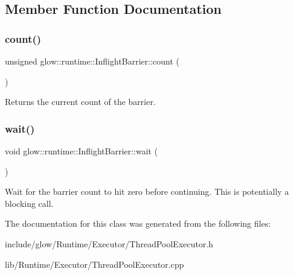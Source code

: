 \subsection{Member Function Documentation}
\mbox{\label{classglow_1_1runtime_1_1_inflight_barrier_acf13957d21ca846a19bc77c8bb841b27}} 
\subsubsection{\texorpdfstring{count()}{count()}}
{\footnotesize\ttfamily unsigned glow\+::runtime\+::\+Inflight\+Barrier\+::count (\begin{DoxyParamCaption}{ }\end{DoxyParamCaption})}

\begin{DoxyReturn}{Returns}
the current count of the barrier. 
\end{DoxyReturn}
\mbox{\label{classglow_1_1runtime_1_1_inflight_barrier_a65478337f00c3da7f5b557ba52789b30}} 
\subsubsection{\texorpdfstring{wait()}{wait()}}
{\footnotesize\ttfamily void glow\+::runtime\+::\+Inflight\+Barrier\+::wait (\begin{DoxyParamCaption}{ }\end{DoxyParamCaption})}

Wait for the barrier count to hit zero before continuing. This is potentially a blocking call. 

The documentation for this class was generated from the following files\+:\begin{DoxyCompactItemize}
\item 
include/glow/\+Runtime/\+Executor/Thread\+Pool\+Executor.\+h\item 
lib/\+Runtime/\+Executor/Thread\+Pool\+Executor.\+cpp\end{DoxyCompactItemize}
